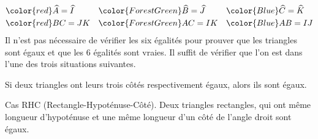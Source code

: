\documentclass[main.tex]{subfiles}
\begin{document}
\setlength{\abovedisplayskip}{0pt}
\setlength{\belowdisplayskip}{0pt} 
\begin{align*}
	& {\color{red} \widehat{A}= \widehat{I} }
	&&  {\color{ForestGreen} \widehat{B}= \widehat{J} } 
	&& {\color{Blue} \widehat{C}= \widehat{K} } \\
	& {\color{red} BC=JK }
	&&  {\color{ForestGreen}  AC=IK } 
	&& {\color{Blue} AB=IJ} 
\end{align*} 
Il n'est pas nécessaire de vérifier les six égalités pour prouver que les triangles sont égaux et que les 6 égalités sont vraies.  
Il suffit de vérifier que l'on est dans l'une des trois situations suivantes.
 
\begin{postulat} 
	Si deux triangles ont leurs trois côtés respectivement égaux, alors ils sont égaux.
	\begin{center}
	\end{center}
\end{postulat} 
\begin{remark}
	Cas RHC (Rectangle-Hypoténuse-Côté). Deux triangles rectangles, qui ont même longueur d'hypoténuse et une même longueur d'un côté de l'angle droit sont égaux.
\end{remark}
\end{document}
